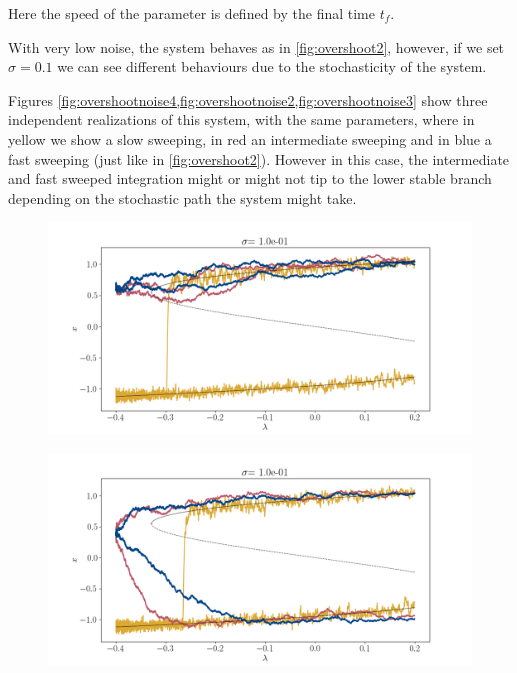 Here the speed of the parameter is defined by the final time $t_f$.

With very low noise, the system behaves as in \cref{fig:overshoot2}, however, if we set $\sigma=0.1$ we can see different behaviours due to the stochasticity of the system. 

Figures \ref{fig:overshootnoise4,fig:overshootnoise2,fig:overshootnoise3} show three independent realizations of this system, with the same parameters, where in \textcolor{col1}{yellow} we show a slow sweeping, in \textcolor{col2}{red} an intermediate sweeping and in \textcolor{col3}{blue} a fast sweeping (just like in \cref{fig:overshoot2}). 
However in this case, the intermediate and fast sweeped integration might or might not tip to the lower stable branch depending on the stochastic path the system might take.

\begin{figure}
	\centering
	\includegraphics[width=0.9\linewidth]{Images/Metrics/overshoot_noise4}
	\caption{}
	\label{fig:overshootnoise4}
\end{figure}

\begin{figure}
	\centering
	\includegraphics[width=0.9\linewidth]{Images/Metrics/overshoot_noise2}
	\caption{}
	\label{fig:overshootnoise2}
\end{figure}

